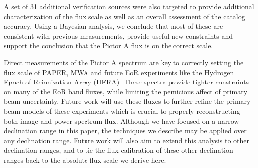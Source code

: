 \documentclass[preprint]{aastex}
\begin{document}
A set of  31 additional verification sources were also targeted to provide additional 
characterization of the flux scale as well as an overall assessment of the catalog accuracy.
Using a Bayesian analysis, we conclude that most of
these are consistent with previous measurements, provide useful new
constraints and support the conclusion that the Pictor A flux is on the correct scale.

Direct measurements of the Pictor A spectrum are key to correctly setting the
flux scale of PAPER, MWA and future EoR experiments like the Hydrogen Epoch of Reionization Array (HERA).
These spectra provide tighter constraints on many of the EoR band fluxes, while
limiting the pernicious affect of primary beam uncertainty.  Future work will use these
fluxes to further refine the primary beam models of these experiments which is crucial to properly reconstructing
both image and power spectrum flux.
Although we have focused on a narrow declination range in this paper, the techniques we describe
may be applied over any declination range.  Future work will also aim to extend this analysis
to other declination ranges, and to tie the flux calibration of these other declination ranges
back to the absolute flux scale we derive here.
\end{document}
